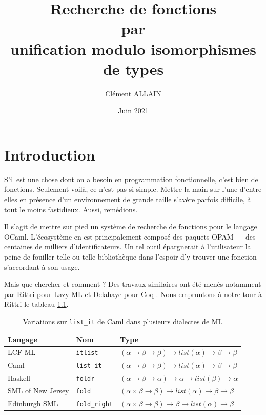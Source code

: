 \documentclass [a4paper] {report}
\title {Recherche de fonctions \\ par \\ unification modulo isomorphismes de types}
\author {Clément ALLAIN}
\date {Juin 2021}
\theoremstyle {definition}
\begin{document}
\maketitle

\tableofcontents

\newpage


\chapter {Introduction}

S'il est une chose dont on a besoin en programmation fonctionnelle, c'est bien de fonctions. Seulement voilà, ce n'est pas si simple. Mettre la main sur l'une d'entre elles en présence d'un environnement de grande taille s'avère parfois difficile, à tout le moins fastidieux. Aussi, remédions.

Il s'agit de mettre sur pied un système de recherche de fonctions pour le langage OCaml. L'écosystème en est principalement composé des paquets OPAM --- des centaines de milliers d'identificateurs. Un tel outil épargnerait à l'utilisateur la peine de fouiller telle ou telle bibliothèque dans l'espoir d'y trouver une fonction s'accordant à son usage.

Mais que chercher et comment ? Des travaux similaires ont été menés notamment par Rittri pour Lazy ML \cite {rittri91, rittri93} et Delahaye pour Coq \cite {delahaye}. Nous empruntons à notre tour à Rittri \cite {rittri91} le tableau \ref {tab_fold}.

\begin {table} [h]
	\centering
	\begin {tabular} {|l|l|l|}
		\hline
			Langage &
			Nom &
			Type
		\\
		\hline
			LCF ML &
			\texttt {itlist} &
			$(\alpha \rightarrow \beta \rightarrow \beta) \rightarrow list (\alpha) \rightarrow \beta \rightarrow \beta$
		\\
			Caml &
			\texttt {list\_it} &
			$(\alpha \rightarrow \beta \rightarrow \beta) \rightarrow list (\alpha) \rightarrow \beta \rightarrow \beta$
		\\
			Haskell &
			\texttt {foldr} &
			$(\alpha \rightarrow \beta \rightarrow \alpha) \rightarrow \alpha \rightarrow list (\beta) \rightarrow \alpha$
		\\
			SML of New Jersey &
			\texttt {fold} &
			$(\alpha \times \beta \rightarrow \beta) \rightarrow list (\alpha) \rightarrow \beta \rightarrow \beta$
		\\
			Edinburgh SML &
			\texttt {fold\_right} &
			$(\alpha \times \beta \rightarrow \beta) \rightarrow \beta \rightarrow list (\alpha) \rightarrow \beta$ \\
		\hline
	\end {tabular}
	\caption {\label {tab_fold} Variations sur \texttt {list\_it} de Caml dans plusieurs dialectes de ML}
\end {table}
\end{document}
